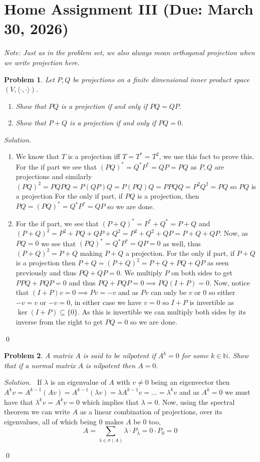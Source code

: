 \documentclass[12pt,a4paper]{article}
\newenvironment{solution}{%
  \par\noindent\textit{Solution.}\ }{\qed}
\theoremstyle{problemstyle}
\newtheorem{problem}{Problem}[section]
\begin{document}
\section{Home Assignment III (Due: March 30, 2026)}
\textit{Note: Just as in the problem set, we also always mean orthogonal projection when we write projection here.}
\begin{problem}\label{prob:3-1}
Let $P, Q$ be projections on a finite dimensional inner product space $(V, \langle \cdot, \cdot \rangle)$.
\begin{enumerate}[\label=(\roman*)]
    \item Show that $PQ$ is a projection if and only if $PQ = QP$.
    \item Show that $P + Q$ is a projection if and only if $PQ = 0$.
\end{enumerate}
\end{problem}
\begin{solution}
\begin{enumerate}[\label=(\roman*)]
	\item We know that $T$ is a projection iff $T=T^*=T^2$, we use this fact to prove this. For the if part we see that $(PQ)^*=Q^*P^*=QP=PQ$ as $P,Q$ are projections and similarly $(PQ)^2=PQPQ=P(QP)Q=P(PQ)Q=PPQQ=P^2Q^2=PQ$ so $PQ$ is a projection For the only if part, if $PQ$ is a projection, then $PQ=(PQ)^*=Q^*P^*=QP$ so we are done. 
	\item For the if part, we see that $(P+Q)^*=P^*+Q^*=P+Q$ and $(P+Q)^2=P^2+PQ+QP+Q^2=P^2+Q^2+QP=P+Q+QP$. Now, as $PQ=0$ we see that $(PQ)^*=Q^*P^*=QP=0$ as well, thus $(P+Q)^2=P+Q$ making $P+Q$ a projection. For the only if part, if $P+Q$ is a projection then $P+Q=(P+Q)^2=P+Q+PQ+QP$ as seen previously and thus $PQ+QP=0$. We multiply $P$ on both sides to get $PPQ+PQP=0$ and thus $PQ+PQP=0\implies PQ(I+P)=0$. Now, notice that $(I+P)v=0\implies Pv=-v$ and as $Pv$ can only be $v$ or $0$ so either $-v=v$ or $-v=0$, in either case we have $v=0$ so $I+P$ is invertible as $\ker(I+P)\subseteq\{0\}$. As this is invertible we can multiply both sides by its inverse from the right to get $PQ=0$ so we are done.
\end{enumerate}
\end{solution}
\begin{problem}\label{prob:3-2}
A matrix $A$ is said to be \textit{nilpotent} if $A^k = 0$ for some $k \in \mathbb{N}$. Show that if a normal matrix $A$ is nilpotent then $A = 0$.
\end{problem}
\begin{solution}
	If $\lambda$ is an eigenvalue of $A$ with $v\neq 0$ being an eigenvector then $A^kv=A^{k-1}(Av)=A^{k-1}(\lambda v)=\lambda A^{k-1}v=\ldots=\lambda^kv$ and as $A^k=0$ we must have that $\lambda^kv=A^kv=0$ which implies that $\lambda=0$. Now, using the spectral theorem we can write $A$ as a linear combination of projections, over its eigenvalues, all of which being $0$ makes $A$ be $0$ too,
\[
	A = \sum_{\lambda\in\sigma(A)}\lambda\cdot P_\lambda=0\cdot P_0=0
\]

\end{solution}
\end{document}
